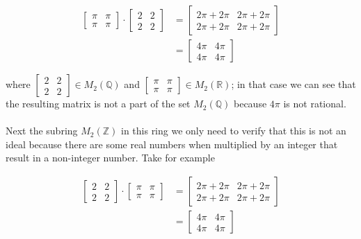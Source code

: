 \documentclass{article}
\begin{document}
          \[
            \begin{split}
              \begin{bmatrix}\pi & \pi \\ \pi & \pi\end{bmatrix} \cdot \begin{bmatrix}2 & 2 \\ 2 & 2\end{bmatrix}  &= \begin{bmatrix}2\pi + 2\pi & 2\pi + 2\pi \\ 2\pi + 2\pi & 2\pi + 2\pi\end{bmatrix}\\
              &= \begin{bmatrix}4\pi & 4\pi \\ 4\pi & 4\pi \end{bmatrix}
            \end{split}
          \]

        \noindent where $\begin{bmatrix}2 & 2 \\ 2 & 2\end{bmatrix} \in M_2(\mathbb{Q})$ and $\begin{bmatrix}\pi & \pi \\ \pi & \pi\end{bmatrix} \in M_2(\mathbb{R})$; in that case we can see that the resulting matrix is not a part of the set $M_2(\mathbb{Q})$ because $4\pi$ is not rational. 

        


        \paragraph{} Next the subring $M_2(\mathbb{Z})$ in this ring we only need to verify that this is not an ideal because there are some real numbers when multiplied by an integer that result in a non-integer number. Take for example

        \[
          \begin{split}
            \begin{bmatrix}2 & 2 \\ 2 & 2\end{bmatrix} \cdot \begin{bmatrix}\pi & \pi \\ \pi & \pi\end{bmatrix} &= \begin{bmatrix}2\pi + 2\pi & 2\pi + 2\pi \\ 2\pi + 2\pi & 2\pi + 2\pi\end{bmatrix}\\
            &= \begin{bmatrix}4\pi & 4\pi \\ 4\pi & 4\pi \end{bmatrix}
          \end{split}
        \]
\end{document}
